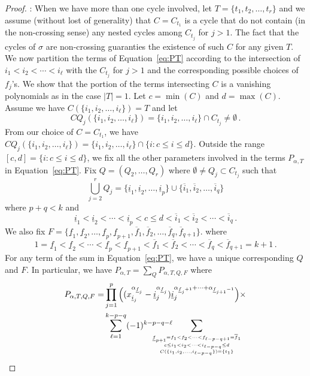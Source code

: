 \documentclass[12pt]{amsart}
\theoremstyle{definition}
\theoremstyle{remark}
\numberwithin{equation}{section}
\begin{document}
\begin{proof}
\medskip 
{}: 
When we have more than one cycle involved, let $T=\{t_1,t_2,\ldots,t_r\}$ and we assume (without lost of generality) that $C=C_{t_1}$
is a cycle that do not contain (in the non-crossing sense) any nested cycles among $C_{t_j}$ for $j>1$. The fact that the cycles of $\sigma$ are non-crossing guaranties the existence of such $C$
for any given $T$.  We now partition the terms of Equation~\eqref{eq:PT} according to the intersection of $ i_1<i_2<\cdots < i_\ell$ with the $C_{t_j}$ for $j>1$ and the corresponding possible choices of $f_j$'s.
We  show that the portion of the terms intersecting $C$ is a vanishing polynomials as in the case $|T|=1$. Let $c=\min(C)$ and $d=\max(C)$.
Assume we have $C(\{ i_1,i_2,\ldots , i_\ell\})=T$ and let 
 	$$CQ_j(\{i_1,i_2,\ldots,i_\ell\})=\{i_1,i_2,\ldots,i_\ell\}\cap C_{t_j}\not= \emptyset\,.$$ 
From our choice of $C=C_{t_1}$, we have $CQ_j(\{i_1,i_2,\ldots,i_\ell\})=\{i_1,i_2,\ldots,i_\ell\}\cap \{i: c\le i\le d\}$. Outside the range $[c,d]=\{i: c\le i\le d\}$, we fix all the other parameters involved in the terms
$P_{\alpha,T}$ in Equation~\eqref{eq:PT}.
Fix $Q=(Q_2,\ldots,Q_r)$ where $\emptyset\not= Q_j\subset C_{t_j}$ such that 
	$$\bigcup_{j=2}^r Q_j = \{\underline{i}_1,\underline{i}_2,\ldots,\underline{i}_p\} \cup  \{\overline{i}_1,\overline{i}_2,\ldots,\overline{i}_q\}$$
where $p+q<k$ and 
	$$\underline{i}_1<\underline{i}_2<\cdots<\underline{i}_p<c\le d<\overline{i}_1<\overline{i}_2<\cdots<\overline{i}_q\,.$$
We also fix $F=\{\underline{f}_1,\underline{f}_2,\ldots,\underline{f}_p,\underline{f}_{p+1},\overline{f}_1,\overline{f}_2,\ldots,\overline{f}_q,\overline{f}_{q+1}\}$. where
	$$1=\underline{f}_1<\underline{f}_2<\cdots<\underline{f}_p<\underline{f}_{p+1}<\overline{f}_1<\overline{f}_2<\cdots<\overline{f}_q<\overline{f}_{q+1}=k+1\,.$$
For any term of the sum in  Equation~\eqref{eq:PT}, we have a unique corresponding $Q$ and $F$. 
In particular, we have $\displaystyle P_{\alpha,T}=\sum_Q P_{\alpha,T,Q,F}$ where
\begin{align*}\label{eq:PTQ}
P_{\alpha,T,Q,F}= &\prod_{j=1}^p 
	     	\Big( (x_{\underline{i}_j}^{\alpha_{\underline{f}_j}}-\underline{i}_j^{\alpha_{\underline{f}_j }})  \underline{i}_j^{\alpha_{\underline{f}_j +1}+\cdots+\alpha_{\underline{f}_{j +1}-1}} \Big) \times\\
	&\sum_{\ell=1}^{k-p-q} (-1)^{k-p-q-\ell} \hskip-1cm
	\sum_{{{{\underline{f}_{p+1}=f_1<f_2<\cdots <f_{\ell-p-q+1}=\overline{f}_1   \atop c \le i_1<i_2<\cdots < i_{\ell-p-q} \le d}\atop C(\{ i_1,i_2,\ldots , i_{\ell-p-q}\})=\{t_1\}}}}

\end{align*}
\end{proof}
\end{document}
